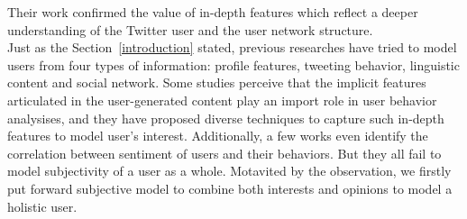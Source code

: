 \documentclass[preprint]{elsarticle}
\begin{document}
Their work confirmed the value of in-depth features which reflect a deeper understanding of the Twitter user and the user network structure.\\
Just as the Section~\ref{introduction} stated, previous researches have tried to model users from four types of information: profile features, tweeting behavior, linguistic content and social network. 
Some studies perceive that the implicit features articulated in the user-generated content play an import role in user behavior analysises,  and they have proposed diverse techniques to capture such in-depth features to model user's interest. 
Additionally, a few works even identify the correlation between sentiment of users and their behaviors.
But they all fail to model subjectivity of a user as a whole.
Motavited by the observation, we firstly put forward subjective model to combine both interests and opinions to model a holistic user. 
\end{document}
